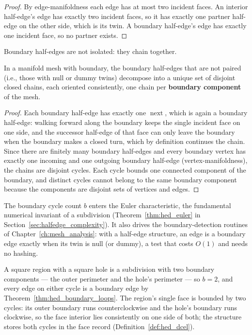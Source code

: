 \begin{proof}
By edge-manifoldness each edge has at most two incident faces. An interior
half-edge's edge has exactly two incident faces, so it has exactly one
partner half-edge on the other side, which is its twin. A boundary
half-edge's edge has exactly one incident face, so no partner exists.
\end{proof}

Boundary half-edges are not isolated: they chain together.

\begin{theorem}\label{thm:hed_boundary_loops}
In a manifold mesh with boundary, the boundary half-edges that are not
paired (i.e., those with null or dummy twins) decompose into a unique set
of disjoint closed chains, each oriented consistently, one chain per
\textbf{boundary component} of the mesh.
\end{theorem}

\begin{proof}
Each boundary half-edge has exactly one $\operatorname{next}$, which is
again a boundary half-edge: walking forward along the boundary keeps the
single incident face on one side, and the successor half-edge of that face
can only leave the boundary when the boundary makes a closed turn, which by
definition continues the chain. Since there are finitely many boundary
half-edges and every boundary vertex has exactly one incoming and one
outgoing boundary half-edge (vertex-manifoldness), the chains are disjoint
cycles. Each cycle bounds one connected component of the boundary, and
distinct cycles cannot belong to the same boundary component because the
components are disjoint sets of vertices and edges.
\end{proof}

The boundary cycle count $b$ enters the Euler
characteristic, the fundamental numerical invariant of a subdivision
(Theorem~\ref{thm:hed_euler} in Section~\ref{sec:halfedge_complexity}). It
also drives the boundary-detection routines of
Chapter~\ref{ch:mesh_analysis}: with a half-edge structure, an edge is a
boundary edge exactly when its twin is null (or dummy), a test that costs
$O(1)$ and needs no hashing.

\begin{example}\label{ex:hed_boundary}
A square region with a square hole is a subdivision with two boundary
components --- the outer perimeter and the hole's perimeter --- so $b = 2$,
and every edge on either cycle is a boundary edge by
Theorem~\ref{thm:hed_boundary_loops}. The region's single face is bounded
by two cycles: its outer boundary runs counterclockwise and the hole's
boundary runs clockwise, so the face interior lies consistently on one side
of both; the structure stores both cycles in the face record
(Definition~\ref{def:hed_dcel}).
\end{example}

